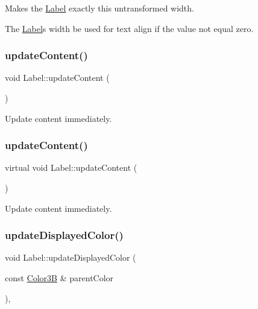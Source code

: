 Makes the \hyperlink{classLabel}{Label} exactly this untransformed width.

The \hyperlink{classLabel}{Label}\textquotesingle{}s width be used for text align if the value not equal zero. \mbox{\label{classLabel_a4c89bb4e6f4fc80a8a19b805b31674b6}} 
\subsubsection{\texorpdfstring{update\+Content()}{updateContent()}\hspace{0.1cm}{\footnotesize\ttfamily [1/2]}}
{\footnotesize\ttfamily void Label\+::update\+Content (\begin{DoxyParamCaption}{ }\end{DoxyParamCaption})\hspace{0.3cm}{\ttfamily [virtual]}}

Update content immediately. \mbox{\label{classLabel_a183778bfa4b5172aa1659bd95c3f58ad}} 
\subsubsection{\texorpdfstring{update\+Content()}{updateContent()}\hspace{0.1cm}{\footnotesize\ttfamily [2/2]}}
{\footnotesize\ttfamily virtual void Label\+::update\+Content (\begin{DoxyParamCaption}{ }\end{DoxyParamCaption})\hspace{0.3cm}{\ttfamily [virtual]}}

Update content immediately. \mbox{\label{classLabel_a22ddaa3b9fb25f6295dcd5ac9545202b}} 
\subsubsection{\texorpdfstring{update\+Displayed\+Color()}{updateDisplayedColor()}\hspace{0.1cm}{\footnotesize\ttfamily [1/2]}}
{\footnotesize\ttfamily void Label\+::update\+Displayed\+Color (\begin{DoxyParamCaption}\item[{const \hyperlink{structColor3B}{Color3B} \&}]{parent\+Color }\end{DoxyParamCaption})\hspace{0.3cm}{\ttfamily [override]}, {\ttfamily [virtual]}}

